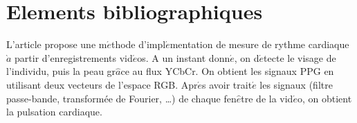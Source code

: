 \documentclass[12 pt]{article}
\begin{document}
\section{Elements bibliographiques}
L'article \cite{Ufuk} propose une m$\acute{e}$thode d'impl$\acute{e}$mentation de mesure de rythme cardiaque $\grave{a}$ partir d'enregistrements vid$\acute{e}$os. 
A un instant donn$\acute{e}$, on d$\acute{e}$tecte le visage de l'individu, puis la peau gr$\hat{a}$ce au flux YCbCr. On obtient les signaux PPG en utilisant deux vecteurs de l'espace RGB. 
Apr$\acute{e}$s avoir trait$\acute{e}$ les signaux (filtre passe-bande, transformée de Fourier, …) de chaque fen$\hat{e}$tre de la vid$\acute{e}$o, on obtient la pulsation cardiaque.

\end{document}
